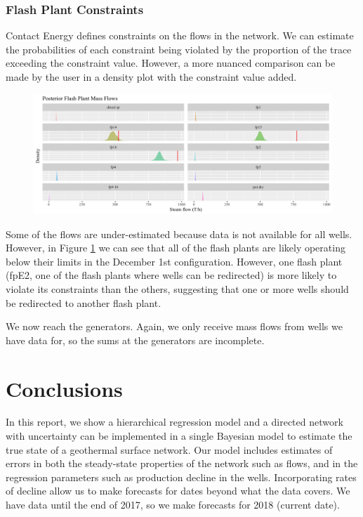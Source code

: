 \documentclass[a4paper, 12pt]{article}
\begin{document}
\subsubsection{Flash Plant Constraints}
Contact Energy defines constraints on the flows in the network. We can estimate the probabilities of each constraint being violated by the proportion of the trace exceeding the constraint value. However, a more nuanced comparison can be made by the user in a density plot with the constraint value added.

\begin{figure}
\centering
  \includegraphics[width=\linewidth]{media/constraints}
  \label{fig:constraints}
\end{figure}

Some of the flows are under-estimated because data is not available for all wells. However, in Figure \ref{fig:constraints} we can see that all of the flash plants are likely operating below their limits in the December 1st configuration. However, one flash plant (fpE2, one of the flash plants where wells can be redirected) is more likely to violate its constraints than the others, suggesting that one or more wells should be redirected to another flash plant.

We now reach the generators. Again, we only receive mass flows from wells we have data for, so the sums at the generators are incomplete.

\section{Conclusions}
In this report, we show a hierarchical regression model and a directed network with uncertainty can be implemented in a single Bayesian model to estimate the true state of a geothermal surface network. Our model includes estimates of errors in both the steady-state properties of the network such as flows, and in the regression parameters such as production decline in the wells. Incorporating rates of decline allow us to make forecasts for dates beyond what the data covers. We have data until the end of 2017, so we make forecasts for 2018 (current date).
\end{document}
